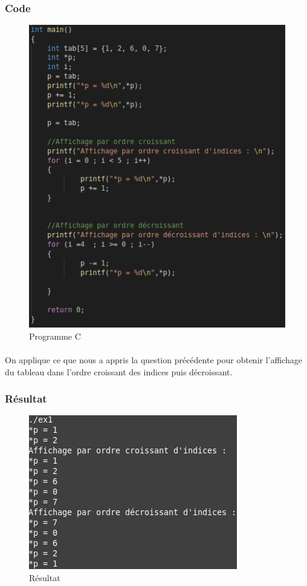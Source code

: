 \documentclass[10pt,a4paper]{article}
\begin{document}
\subsubsection{Code}
\begin{figure}[h]
\begin{center}
\includegraphics[scale=.3]{images/ex1_c}
\end{center}
\caption{Programme C}
\end{figure}
\paragraph{}
On applique ce que nous a appris la question précédente pour obtenir l'affichage du tableau dans l'ordre croissant 
des indices puis décroissant.
\subsubsection{Résultat}
\begin{figure}[h] 
\begin{center}
\includegraphics[scale=.3]{images/ex1_ex}
\end{center}
\caption{Résultat}
\end{figure}
\end{document}
